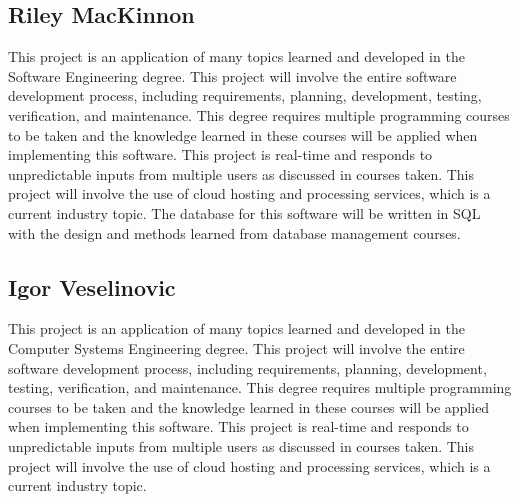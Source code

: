 \documentclass[letterpaper,12pt]{report}
\begin{document}
	\subsection*{Riley MacKinnon}
	\markright{}
	This project is an application of many topics learned and developed in the
	Software Engineering degree. This project will involve the entire software development
	process, including requirements, planning, development, testing,
	verification, and maintenance. This degree requires multiple programming
	courses to be taken and the knowledge learned in these courses will be
	applied when implementing this software. This project is real-time and
	responds to unpredictable inputs from multiple users as discussed in
	courses taken. This project will involve the use of cloud hosting and
	processing services, which is a current industry topic. The database for
	this software will be written in SQL with the design and methods learned
	from database management courses.

	\subsection*{Igor Veselinovic}
	\markright{}
	This project is an application of many topics learned and developed in the
	Computer Systems Engineering degree. This project will involve the entire
	software development process, including requirements, planning,
	development, testing, verification, and maintenance. This degree requires
	multiple programming courses to be taken and the knowledge learned in these
	courses will be applied when implementing this software. This project is
	real-time and responds to unpredictable inputs from multiple users as
	discussed in courses taken. This project will involve the use of cloud
	hosting and processing services, which is a current industry topic.
\end{document}
